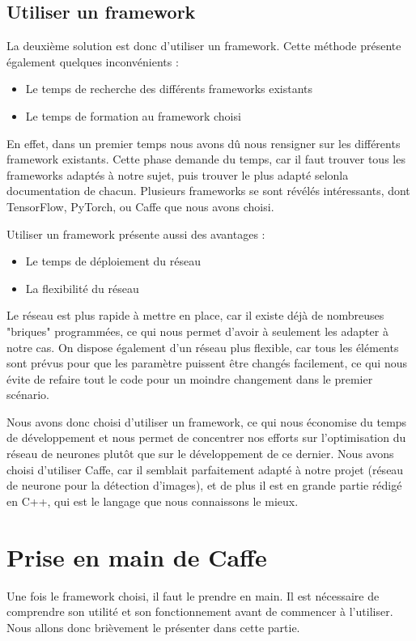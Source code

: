 \documentclass[a4paper,12pt]{article}
\begin{document}
  \subsection{Utiliser un framework}
    La deuxième solution est donc d'utiliser un framework. Cette méthode présente également quelques inconvénients : 
    \begin{itemize}
      \item Le temps de recherche des différents frameworks existants
      \item Le temps de formation au framework choisi
    \end{itemize}

    En effet, dans un premier temps nous avons dû nous rensigner sur les différents framework existants. Cette phase demande du temps, car il faut trouver tous les frameworks adaptés à notre sujet, puis trouver le plus adapté selonla documentation de chacun. Plusieurs frameworks se sont révélés intéressants, dont TensorFlow, PyTorch, ou Caffe que nous avons choisi.

    Utiliser un framework présente aussi des avantages :
    \begin{itemize}
      \item Le temps de déploiement du réseau
      \item La flexibilité du réseau
    \end{itemize}

    Le réseau est plus rapide à mettre en place, car il existe déjà de nombreuses "briques" programmées, ce qui nous permet d'avoir à seulement les adapter à notre cas. On dispose également d'un réseau plus flexible, car tous les éléments sont prévus pour que les paramètre puissent être changés facilement, ce qui nous évite de refaire tout le code pour un moindre changement dans le premier scénario.

    Nous avons donc choisi d'utiliser un framework, ce qui nous économise du temps de développement et nous permet de concentrer nos efforts sur l'optimisation du réseau de neurones plutôt que sur le développement de ce dernier. Nous avons choisi d'utiliser Caffe, car il semblait parfaitement adapté à notre projet (réseau de neurone pour la détection d'images), et de plus il est en grande partie rédigé en C++, qui est le langage que nous connaissons le mieux.

\newpage
\section{Prise en main de Caffe}
  Une fois le framework choisi, il faut le prendre en main. Il est nécessaire de comprendre son utilité et son fonctionnement avant de commencer à l'utiliser. Nous allons donc brièvement le présenter dans cette partie.
  
\end{document}
